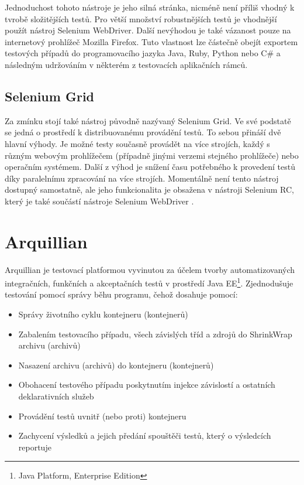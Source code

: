 \documentclass[
    color,   %
	table,   %
    twoside, %
    nolot, nolof
]{fithesis3}
\begin{document}
Jednoduchost tohoto nástroje je jeho silná stránka, nicméně není příliš vhodný k tvrobě složitějších testů. Pro větší množství robustnějších testů je vhodnější použít nástroj Selenium WebDriver. Další nevýhodou je také vázanost pouze na internetový prohlížeč Mozilla Firefox. Tuto vlastnost lze částečně obejít exportem testových případů do programovacího jazyka Java, Ruby, Python nebo C\# a následným udržováním v některém z testovacích aplikačních rámců.

\subsection{Selenium Grid}
Za zmínku stojí také nástroj původně nazývaný Selenium Grid. Ve své podstatě se jedná o prostředí k distribuovanému provádění testů. To sebou přináší dvě hlavní výhody. Je možné testy současně provádět na více strojích, každý s různým webovým prohlížečem (případně jinými verzemi stejného prohlížeče) nebo operačním systémem. Další z výhod je snížení času potřebného k provedení testů díky paralelnímu zpracování na více strojích. Momentálně není tento nástroj dostupný samostatně, ale jeho funkcionalita je obsažena v nástroji Selenium RC, který je také součástí nástroje Selenium WebDriver \cite{Selenium}.

\section{Arquillian}

Arquillian je testovací platformou vyvinutou za účelem tvorby automatizovaných integračních, funkčních a akceptačních testů v prostředí Java EE\footnote{Java Platform, Enterprise Edition}. Zjednodušuje testování pomocí správy běhu programu, čehož dosahuje pomocí:
\begin{itemize}
\item Správy životního cyklu kontejneru (kontejnerů)
\item Zabalením testovacího případu, všech závislých tříd a zdrojů do ShrinkWrap \cite{ShrinkWrap} archivu (archivů)
\item Nasazení archivu (archivů) do kontejneru (kontejnerů)
\item Obohacení testového případu poskytnutím injekce závislostí a ostatních deklarativních služeb
\item Provádění testů uvnitř (nebo proti) kontejneru
\item Zachycení výsledků a jejich předání spouštěči testů, který o výsledcích reportuje
\end{itemize}
\end{document}
